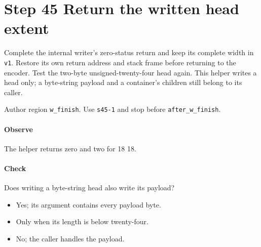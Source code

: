 \section{Step 45 Return the written head extent}\label{cbor-s45}
Complete the internal writer's zero-status return and keep its complete width in \texttt{v1}. Restore its own return address and stack frame before returning to the encoder. Test the two-byte unsigned-twenty-four head again. This helper writes a head only; a byte-string payload and a container's children still belong to its caller.

Author region \texttt{w\_finish}. Use \texttt{s45-1} and stop before \texttt{after\_w\_finish}.

\paragraph{Observe} The helper returns zero and two for 18 18.

\paragraph{Check} Does writing a byte-string head also write its payload?
\begin{itemize}
  \item[A.] Yes; its argument contains every payload byte.
  \item[B.] Only when its length is below twenty-four.
  \item[C.] No; the caller handles the payload.
\end{itemize}
